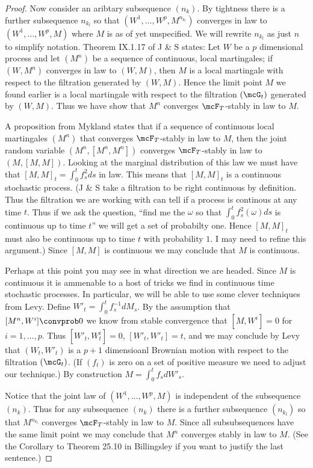 \documentclass{report}
\begin{document}
\begin{proof}
Now consider an aribtary subsequence $(n_k)$.  By tightness there is a
further subsequence $n_{k_l}$ so that $(W^1, \ldots, W^p,
M^{n_{k_l}})$ converges in law to $(W^1, \ldots, W^p, M)$ where $M$ is
as of yet unspecified.  We will rewrite $n_{k_l}$ as just $n$ to
simplify notation.  Theorem IX.1.17 of J \& S states: Let $W$ be a $p$
dimensional process and let $(M^n)$ be a sequence of continuous, local
martingales; if $(W,M^n)$ converges in law to $(W,M)$, then $M$ is a
local martingale with respect to the filtration generated by $(W,M)$. 
Hence the limit point $M$ we found earlier is a local martingale with
respect to the filtration $(\mcG_t)$ generated by $(W,M)$.  Thus we
have show that $M^n$ converges $\mcF_T$-stably in law to $M$.  

A proposition from Mykland states that if a sequence of continuous
local martingales $(M^n)$ that converges $\mcF_T$-stably in law to
$M$, then the joint random variable $(M^n, [M^n,M^n])$ converges
$\mcF_T$-stably in law to $(M,[M,M])$.  Looking at the marginal
distribution of this law we must have that $[M,M]_t = \int_0^t f_s^2
ds$ in law.  This means that $[M,M]_t$ is a continuous stochastic
process.  (J \& S take a filtration to be right continuous by
definition.  Thus the filtration we are working with can tell if a
process is continous at any time $t$.  Thus if we ask the question,
``find me the $\omega$ so that $\int_0^t f_s^2(\omega) ds$ is
continuous up to time $t$'' we will get a set of probabilty one. 
Hence $[M,M]_t$ must also be continuous up to time $t$ with
probability $1$.  I may need to refine this argument.)  Since $[M,M]$
is continuous we may conclude that $M$ is continuous.

Perhaps at this point you may see in what direction we are headed. 
Since $M$ is continuous it is ammenable to a host of tricks we find in
continuous time stochastic processes.  In particular, we will be able
to use some clever techniques from Levy.  Define $W'_t = \int_0^t 
f^{-1}_s dM_s$.  By the assumption that $[M^n,W^i] \convprob 0$ we
know from stable convergence that $[M,W^i] = 0$ for $i = 1, \ldots,
p$.  Thus $[W'_t,W^i_t] = 0$, $[W'_t, W'_t] = t$, and we may conclude
by Levy that $(W_t,W'_t)$ is a $p+1$ dimensioanl Brownian motion with
respect to the filtration $(\mcG_t)$.  (If $(f_t)$ is zero on a set of
positive measure we need to adjust our technique.)  By construction $M
= \int_0^t f_s dW'_s$.  

Notice that the joint law of $(W^1,\ldots,W^p,M)$ is independent of
the subsequence $(n_k)$.  Thus for any subsequence $(n_k)$ there is a
further subsequence $(n_{k_l})$ so that $M^{n_{k_l}}$ converges
$\mcF_T$-stably in law to $M$.  Since all subsubsequences have the
same limit point we may conclude that $M^n$ converges stably in law to
$M$.  (See the Corollary to Theorem 25.10 in Billingsley if you want
to justify the last sentence.)
\end{proof}
\end{document}
